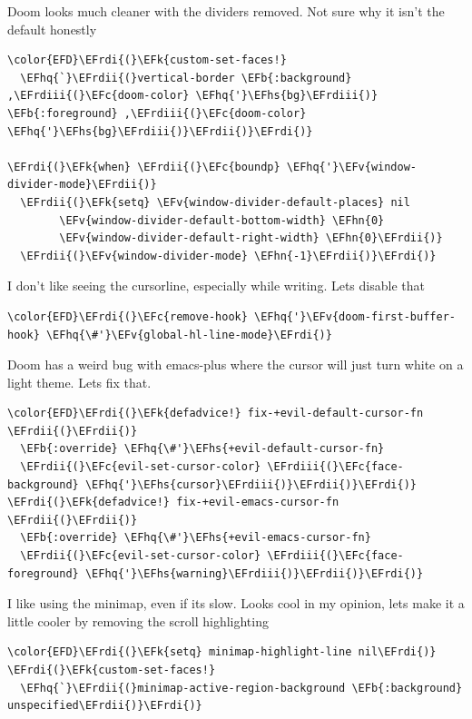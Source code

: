 \documentclass{scrartcl}
\newcommand{\EFk}[1]{\textcolor{EFk}{#1}} %
\newcommand{\EFb}[1]{\textcolor{EFb}{#1}} %
\newcommand{\EFc}[1]{\textcolor{EFc}{#1}} %
\newcommand{\EFv}[1]{\textcolor{EFv}{#1}} %
\newcommand{\EFhn}[1]{#1} %
\newcommand{\EFhq}[1]{#1} %
\newcommand{\EFhs}[1]{#1} %
\newcommand{\EFrdi}[1]{#1} %
\newcommand{\EFrdii}[1]{#1} %
\newcommand{\EFrdiii}[1]{#1} %
\begin{document}
Doom looks much cleaner with the dividers removed. Not sure why it isn't the default honestly
\begin{Code}
\begin{Verbatim}[]
\color{EFD}\EFrdi{(}\EFk{custom-set-faces!}
  \EFhq{`}\EFrdii{(}vertical-border \EFb{:background} ,\EFrdiii{(}\EFc{doom-color} \EFhq{'}\EFhs{bg}\EFrdiii{)} \EFb{:foreground} ,\EFrdiii{(}\EFc{doom-color} \EFhq{'}\EFhs{bg}\EFrdiii{)}\EFrdii{)}\EFrdi{)}

\EFrdi{(}\EFk{when} \EFrdii{(}\EFc{boundp} \EFhq{'}\EFv{window-divider-mode}\EFrdii{)}
  \EFrdii{(}\EFk{setq} \EFv{window-divider-default-places} nil
        \EFv{window-divider-default-bottom-width} \EFhn{0}
        \EFv{window-divider-default-right-width} \EFhn{0}\EFrdii{)}
  \EFrdii{(}\EFv{window-divider-mode} \EFhn{-1}\EFrdii{)}\EFrdi{)}
\end{Verbatim}
\end{Code}

I don't like seeing the cursorline, especially while writing. Lets disable that
\begin{Code}
\begin{Verbatim}[]
\color{EFD}\EFrdi{(}\EFc{remove-hook} \EFhq{'}\EFv{doom-first-buffer-hook} \EFhq{\#'}\EFv{global-hl-line-mode}\EFrdi{)}
\end{Verbatim}
\end{Code}

Doom has a weird bug with emacs-plus where the cursor will just turn white on a light theme. Lets fix that.
\begin{Code}
\begin{Verbatim}[]
\color{EFD}\EFrdi{(}\EFk{defadvice!} fix-+evil-default-cursor-fn \EFrdii{(}\EFrdii{)}
  \EFb{:override} \EFhq{\#'}\EFhs{+evil-default-cursor-fn}
  \EFrdii{(}\EFc{evil-set-cursor-color} \EFrdiii{(}\EFc{face-background} \EFhq{'}\EFhs{cursor}\EFrdiii{)}\EFrdii{)}\EFrdi{)}
\EFrdi{(}\EFk{defadvice!} fix-+evil-emacs-cursor-fn \EFrdii{(}\EFrdii{)}
  \EFb{:override} \EFhq{\#'}\EFhs{+evil-emacs-cursor-fn}
  \EFrdii{(}\EFc{evil-set-cursor-color} \EFrdiii{(}\EFc{face-foreground} \EFhq{'}\EFhs{warning}\EFrdiii{)}\EFrdii{)}\EFrdi{)}
\end{Verbatim}
\end{Code}

I like using the minimap, even if its slow. Looks cool in my opinion, lets make it a little cooler by removing the scroll highlighting
\begin{Code}
\begin{Verbatim}[]
\color{EFD}\EFrdi{(}\EFk{setq} minimap-highlight-line nil\EFrdi{)}
\EFrdi{(}\EFk{custom-set-faces!}
  \EFhq{`}\EFrdii{(}minimap-active-region-background \EFb{:background} unspecified\EFrdii{)}\EFrdi{)}
\end{Verbatim}
\end{Code}
\end{document}
